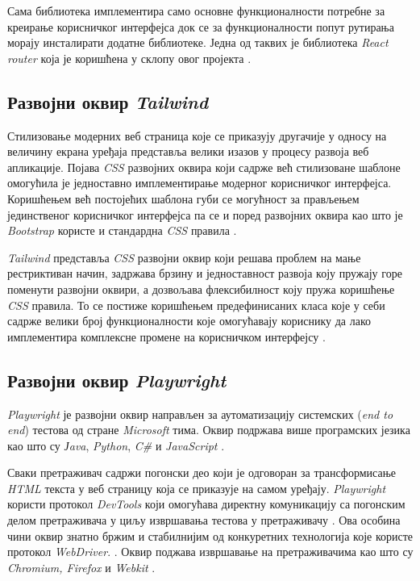 \documentclass[12pt,oneside]{memoir}
\begin{document}
Сама библиотека имплементира само основне функционалности потребне за креирање корисничког интерфејса док се за функционалности попут рутирања морају инсталирати додатне библиотеке. Једна од таквих је библиотека \textit{React router} која је коришћена у склопу овог пројекта \cite{reactRouter}.

\subsection{Развојни оквир \textit{Tailwind} }

Стилизовање модерних веб страница које се приказују другачије у односу на величину екрана уређаја представља велики изазов у процесу развоја веб апликације. Појава \textit{CSS} развојних оквира који садрже већ стилизоване шаблоне омогућила је једноставно имплементирање модерног корисничког интерфејса. Коришћењем већ постојећих шаблона губи се могућност за прављењем јединственог корисничког интерфејса па се и поред развојних оквира као што је \textit{Bootstrap} користе и стандардна \textit{CSS} правила \cite{bootstrap}.

\textit{Tailwind} представља \textit{CSS} развојни оквир који решава проблем на мање рестриктиван начин, задржава брзину и једноставност развоја коју пружају горе поменути развојни оквири, а дозвољава флексибилност коју пружа коришћење \textit{CSS} правила. То се постиже коришћењем предефинисаних класа које у себи садрже велики број функционалности које омогућавају кориснику да лако имплементира комплексне промене на корисничком интерфејсу \cite{tailwind}.


\subsection{Развојни оквир \textit{Playwright}}

\textit{Playwright} је развојни оквир направљен за аутоматизацију системских (\textit{end to end}) тестова од стране \textit{Microsoft} тима. Оквир подржава више програмских језика као што су \textit{Јava}, \textit{Python}, \textit{C\#}  и \textit{JavaScript} \cite{playwright}.

Сваки претраживач садржи погонски део који је одговоран за трансформисање \textit{HTML} текста у веб страницу која се приказује на самом уређају. \textit{Playwright} користи протокол \textit{DevTools} који омогућава директну комуникацију са погонским делом претраживача у циљу извршавања тестова у претраживачу \cite{playwrightTutorial}. Ова особина чини оквир знатно бржим и стабилнијим од конкуретних технологија које користе протокол \textit{WebDriver}. \cite{playwrightVsSelenium,speedTest}. Оквир поджава извршавање на претраживачима као што су \textit{Chromium,  Firefox} и \textit{Webkit} \cite{playwright, chromium,webKit}.
\end{document}
